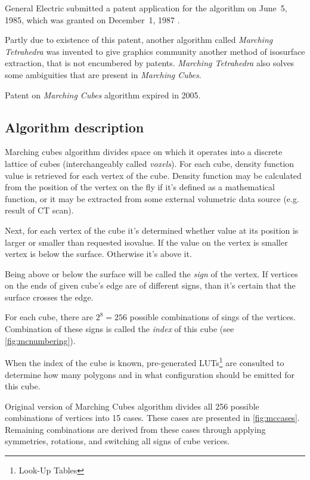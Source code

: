 General Electric submitted a patent application for the algorithm on
June~5, 1985, which was granted on December~1, 1987 \parencite{mcpatent}.

Partly due to existence of this patent, another algorithm called
\emph{Marching Tetrahedra} was invented to give graphics community another
method of isosurface extraction, that is not encumbered by patents.
\emph{Marching Tetrahedra} also solves some ambiguities that are present in
\emph{Marching Cubes}.

Patent on \emph{Marching Cubes} algorithm expired in 2005.

\subsection{Algorithm description \parencite{Lorensen:1987:MCH:37402.37422}}
\label{sec:mcdesc}

Marching cubes algorithm divides space on which it operates into a discrete
lattice of cubes (interchangeably called \emph{voxels}). For each cube, density
function value is retrieved for each vertex of the cube. Density function may be
calculated from the position of the vertex on the fly if it's defined as a
mathematical function, or it may be extracted from some external volumetric data
source (e.g. result of CT scan).

Next, for each vertex of the cube it's determined whether value at its position
is larger or smaller than requested isovalue. If the value on the vertex is
smaller vertex is below the surface. Otherwise it's above it.

Being above or below the surface will be called the \emph{sign} of the vertex.
If vertices on the ends of given cube's edge are of different signs, than it's
certain that the surface crosses the edge.

For each cube, there are $2^8=256$ possible combinations of sings of the
vertices. Combination of these signs is called the
\emph{index} of this cube (see \autoref{fig:mcnumbering}).

When the index of the cube is known, pre-generated LUTs\footnote{Look-Up Tables}
are consulted to determine how many polygons and in what configuration should be
emitted for this cube.

Original version of Marching Cubes algorithm divides all 256 possible
combinations of vertices into 15 cases. These cases are presented in
\autoref{fig:mccases}. Remaining combinations are derived from these cases
through applying symmetries, rotations, and switching all signs of cube verices.

